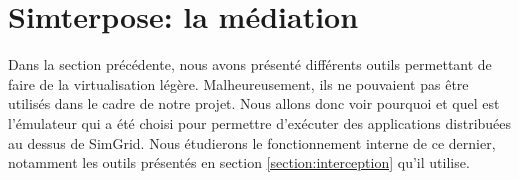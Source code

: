 \section{Simterpose: la médiation}
\label{section:simterpose}

Dans la section précédente, nous avons présenté différents outils permettant de
faire de la virtualisation légère. Malheureusement, ils ne pouvaient pas être
utilisés dans le cadre de notre projet. Nous allons donc voir pourquoi et quel
est l'émulateur qui a été choisi pour permettre d'exécuter des applications
distribuées au dessus de SimGrid. Nous étudierons le fonctionnement interne de
ce dernier, notamment les outils présentés en section \ref{section:interception}
qu'il utilise.
